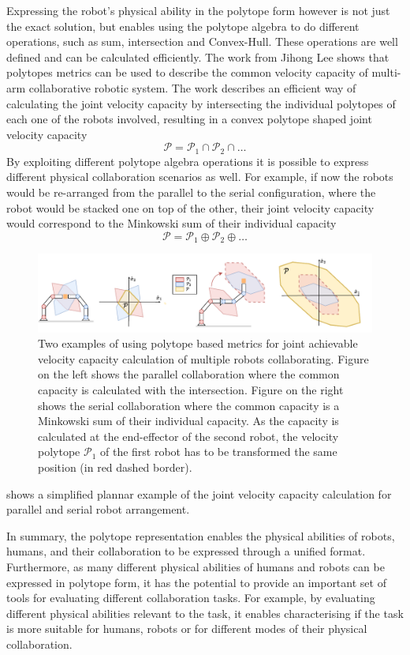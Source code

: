 Expressing the robot's physical ability in the polytope form however is not just the exact solution, but enables using the polytope algebra to do different operations, such as sum, intersection and Convex-Hull. These operations are well defined and can be calculated efficiently. The work from Jihong Lee \cite{lee2001velocity} shows that polytopes metrics can be used to describe the common velocity capacity of multi-arm collaborative robotic system.  The work describes an efficient way of calculating the joint velocity capacity by intersecting the individual polytopes of each one of the robots involved, resulting in a convex polytope shaped joint velocity capacity $$\mathcal{P}=\mathcal{P}_1 \cap \mathcal{P}_2  \cap \ldots$$
By exploiting different polytope algebra operations it is possible to express different physical collaboration scenarios as well. For example, if now the robots would be re-arranged from the parallel to the serial configuration, where the robot would be stacked one on top of the other, their joint velocity capacity would correspond to the Minkowski sum of their individual capacity $$\mathcal{P}=\mathcal{P}_1 \oplus \mathcal{P}_2  \oplus \ldots$$

\begin{figure}[!h]
    \centering
    \includegraphics[width=\linewidth]{Chapters/imgs/collab_serial_parallel.pdf}
    \caption{Two examples of using polytope based metrics for joint achievable velocity capacity calculation of multiple robots collaborating. Figure on the left shows the parallel collaboration where the common capacity is calculated with the intersection. Figure on the right shows the serial collaboration where the common capacity is a Minkowski sum of their individual capacity. As the capacity is calculated at the end-effector of the second robot, the velocity polytope $\mathcal{P}_1$ of the first robot has to be transformed the same position (in red dashed border).}
    \label{fig:collab_serial_parallel}
\end{figure}
 shows a simplified plannar example of the joint velocity capacity calculation for parallel and serial robot arrangement.

In summary, the polytope representation enables the physical abilities of robots, humans, and their collaboration to be expressed through a unified format. Furthermore, as many different physical abilities of humans and robots can be expressed in polytope form, it has the potential to provide an important set of tools for evaluating different collaboration tasks.
For example, by evaluating different physical abilities relevant to the task, it enables characterising if the task is more suitable for humans, robots or for different modes of their physical collaboration.  


